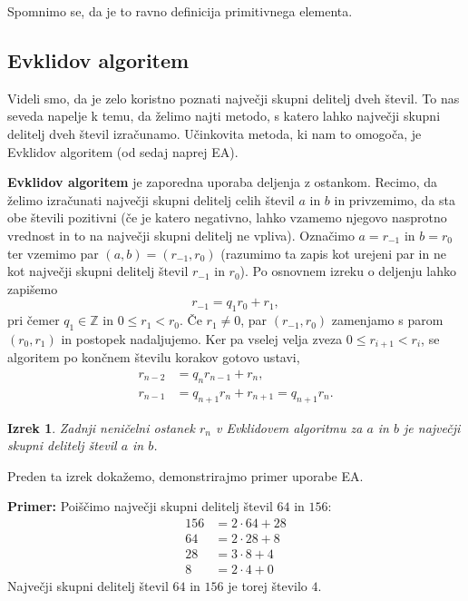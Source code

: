\documentclass[12pt, a4paper]{article}
\newtheorem{izr}{Izrek}
\newenvironment{prim}[1][]{\par\medskip\noindent \textbf{Primer: }}{\medskip}
\begin{document}
Spomnimo se, da je to ravno definicija primitivnega elementa.

\subsection{Evklidov algoritem}

Videli smo, da je zelo koristno poznati največji skupni delitelj dveh števil. To nas seveda napelje k temu, da želimo najti metodo, s katero lahko največji skupni delitelj dveh števil izračunamo. Učinkovita metoda, ki nam to omogoča, je Evklidov algoritem (od sedaj naprej EA).

\textbf{Evklidov algoritem} je zaporedna uporaba deljenja z ostankom. Recimo, da želimo izračunati največji skupni delitelj celih števil $a$ in $b$ in privzemimo, da sta obe števili pozitivni (če je katero negativno, lahko vzamemo njegovo nasprotno vrednost in to na največji skupni delitelj ne vpliva). Označimo $a=r_{-1}$ in $b=r_0$ ter vzemimo par $(a,b)=(r_{-1}, r_0)$ (razumimo ta zapis kot urejeni par in ne kot največji skupni delitelj števil $r_{-1}$ in $r_0$). Po osnovnem izreku o deljenju lahko zapišemo
$$r_{-1} = q_1 r_0 + r_1,$$
pri čemer $q_1\in \mathbb{Z}$ in $0\leq r_1 < r_0$. Če $r_1 \neq 0$, par $(r_{-1}, r_0)$ zamenjamo s parom $(r_0, r_1)$ in postopek nadaljujemo. Ker pa vselej velja zveza $0\leq r_{i+1} < r_i$, se algoritem po končnem številu korakov gotovo ustavi,
\begin{align*}
r_{n-2} &= q_n r_{n-1} + r_n, \\
r_{n-1} &= q_{n+1} r_n + r_{n+1}=  q_{n+1} r_n.
\end{align*}

\begin{izr}
Zadnji neničelni ostanek $r_n$ v Evklidovem algoritmu za $a$ in $b$ je največji skupni delitelj števil $a$ in $b$.
\end{izr}

Preden ta izrek dokažemo, demonstrirajmo primer uporabe EA.

\begin{prim}
Poiščimo največji skupni delitelj števil $64$ in $156$:
\begin{align*}
156 &= 2\cdot 64 + 28 \\
64 &= 2\cdot 28 + 8 \\
28 &= 3\cdot 8 + 4 \\
8 &= 2\cdot 4 + 0
\end{align*} 
Največji skupni delitelj števil $64$ in $156$ je torej število $4$.
\end{prim}
\end{document}

